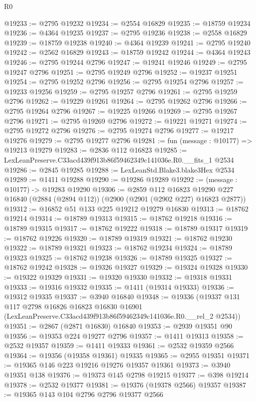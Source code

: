 \begin{lexlean}{R0}
\begin{coremodule}
@19233 := @2795 @19232
@19234 := @2554 @16829
@19235 := @18759 @19234
@19236 := @4364 @19235
@19237 := @2795 @19236
@19238 := @2558 @16829
@19239 := @18759 @19238
@19240 := @4364 @19239
@19241 := @2795 @19240
@19242 := @2562 @16829
@19243 := @18759 @19242
@19244 := @4364 @19243
@19246 := @2795 @19244 @2796
@19247 := @19241 @19246
@19249 := @2795 @19247 @2796
@19251 := @2795 @19249 @2796
@19252 := @19237 @19251
@19254 := @2795 @19252 @2796
@19256 := @2795 @19254 @2796
@19257 := @19233 @19256
@19259 := @2795 @19257 @2796
@19261 := @2795 @19259 @2796
@19262 := @19229 @19261
@19264 := @2795 @19262 @2796
@19266 := @2795 @19264 @2796
@19267 := @19225 @19266
@19269 := @2795 @19267 @2796
@19271 := @2795 @19269 @2796
@19272 := @19221 @19271
@19274 := @2795 @19272 @2796
@19276 := @2795 @19274 @2796
@19277 := @19217 @19276
@19279 := @2795 @19277 @2796
@19281 := fun (message : @10177) => @19213 @19279
@19283 := @2836 @112 @16823
@19285 := LexLeanPreserve.C33acd439f913b86f59462349c141036e.R0.__fits_1 @2534
@19286 := @2845 @19285
@19288 := LexLeanStd.Blake3.blake3Hex @2534
@19289 := @1411 @19288
@19290 := @19286 @19289
@19292 := (message : @10177) -> @19283 @19290
@19306 := @2859
    @112
    @16823
    @19290
    @227
    @16840
    (@2884 (@2894 @112))
    (@2900 (@2901 (@2902 @227) @16823 @2877))
@19312 := @16852 @51 @133 @225 @19212 @19279 @16830
@19313 := @18762 @19214
@19314 := @18789 @19313
@19315 := @18762 @19218
@19316 := @18789 @19315
@19317 := @18762 @19222
@19318 := @18789 @19317
@19319 := @18762 @19226
@19320 := @18789 @19319
@19321 := @18762 @19230
@19322 := @18789 @19321
@19323 := @18762 @19234
@19324 := @18789 @19323
@19325 := @18762 @19238
@19326 := @18789 @19325
@19327 := @18762 @19242
@19328 := @19326 @19327
@19329 := @19324 @19328
@19330 := @19322 @19329
@19331 := @19320 @19330
@19332 := @19318 @19331
@19333 := @19316 @19332
@19335 := @1411 (@19314 @19333)
@19336 := @19312 @19335
@19337 := @3940 @16840
@19348 := @19336
    (@19337
      @131
      @117
      @2798
      @16826
      @16823
      @16830
      @16901
      (LexLeanPreserve.C33acd439f913b86f59462349c141036e.R0.__rel_2 @2534))
@19351 := @2867 (@2871 @16830) @16840
@19353 := @2939 @19351 @90
@19356 := @19353 @224 @19277 @2796
@19357 := @1411 @19313
@19358 := @2532 @19357
@19359 := @1411 @19333
@19361 := @2532 @19359 @2566
@19364 := @19356 (@19358 @19361) @19335
@19365 := @2955 @19351
@19371 := @19365 @146 @223 @19216 @19276 @19357 @19361
@19373 := @3940 @19351 @138
@19376 := @19373 @145 @2798 @19215
@19377 := @398 @19214
@19378 := @2532 @19377
@19381 := @19376 (@19378 @2566) @19357
@19387 := @19365 @143 @104 @2796 @2796 @19377 @2566

\end{coremodule}
\end{lexlean}
